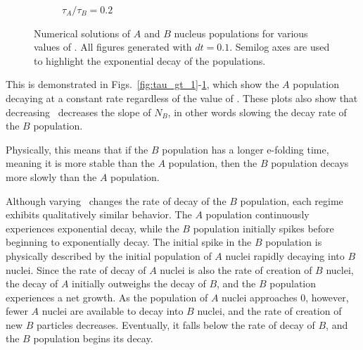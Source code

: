 \documentclass[pra,twocolumn,showpacs,amsmath,amssymb]{revtex4-1}
\begin{document}
\begin{figure}
\begin{subfigure}{.7\linewidth}
     \caption{$\tau_A / \tau_B=0.2$}
     \label{fig:tau_lt_1}
   \end{subfigure}

   \caption{Numerical solutions of $A$ and $B$ nucleus populations for various values of \trel.
   All figures generated with $dt=0.1$. Semilog axes are used to highlight the
   exponential decay of the populations.}
   \label{fig:numerical}
 \end{figure}

This is demonstrated in Figs.~\ref{fig:tau_gt_1}-\ref{fig:tau_lt_1}, which show
the $A$ population decaying at a constant rate regardless of the value of \trel.
These plots also show that decreasing \trel~decreases the slope of $N_B$,
in other words slowing the decay rate of the $B$ population.

Physically, this means that if the $B$ population has a longer e-folding time,
meaning it is more stable than the $A$ population, then the $B$ population decays
more slowly than the $A$ population.

Although varying \trel~changes the rate of decay of the $B$ population, each
regime exhibits qualitatively similar behavior. The $A$ population continuously
experiences exponential decay, while the $B$ population initially spikes before
beginning to exponentially decay. The initial spike in the $B$ population is
physically described by the initial population of $A$ nuclei rapidly decaying
into $B$ nuclei. Since the rate of decay of $A$ nuclei is also the rate of creation
of $B$ nuclei, the decay of $A$ initially outweighs the decay of $B$, and the $B$
population experiences a net growth.
As the population of $A$ nuclei approaches 0, however, fewer $A$ nuclei
are available to decay into $B$ nuclei, and the rate of creation of new $B$
particles decreases. Eventually, it falls below the rate of decay of $B$, and
the $B$ population begins its decay.
\end{document}
